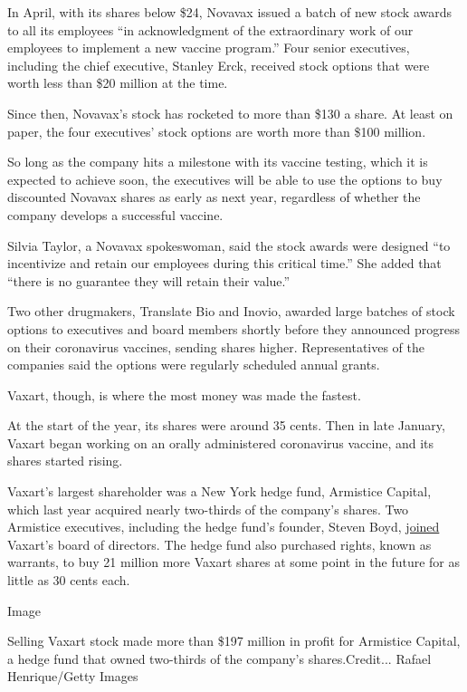 In April, with its shares below \$24, Novavax issued a batch of new
stock awards to all its employees ``in acknowledgment of the
extraordinary work of our employees to implement a new vaccine
program.'' Four senior executives, including the chief executive,
Stanley Erck, received stock options that were worth less than \$20
million at the time.

Since then, Novavax's stock has rocketed to more than \$130 a share. At
least on paper, the four executives' stock options are worth more than
\$100 million.

So long as the company hits a milestone with its vaccine testing, which
it is expected to achieve soon, the executives will be able to use the
options to buy discounted Novavax shares as early as next year,
regardless of whether the company develops a successful vaccine.

Silvia Taylor, a Novavax spokeswoman, said the stock awards were
designed ``to incentivize and retain our employees during this critical
time.'' She added that ``there is no guarantee they will retain their
value.''

Two other drugmakers, Translate Bio and Inovio, awarded large batches of
stock options to executives and board members shortly before they
announced progress on their coronavirus vaccines, sending shares higher.
Representatives of the companies said the options were regularly
scheduled annual grants.

Vaxart, though, is where the most money was made the fastest.

At the start of the year, its shares were around 35 cents. Then in late
January, Vaxart began working on an orally administered coronavirus
vaccine, and its shares started rising.

Vaxart's largest shareholder was a New York hedge fund, Armistice
Capital, which last year acquired nearly two-thirds of the company's
shares. Two Armistice executives, including the hedge fund's founder,
Steven Boyd,
\href{https://investors.vaxart.com/news-releases/news-release-details/vaxart-inc-announces-changes-its-board-directors}{joined}
Vaxart's board of directors. The hedge fund also purchased rights, known
as warrants, to buy 21 million more Vaxart shares at some point in the
future for as little as 30 cents each.

Image

Selling Vaxart stock made more than \$197 million in profit for
Armistice Capital, a hedge fund that owned two-thirds of the company's
shares.Credit... Rafael Henrique/Getty Images


